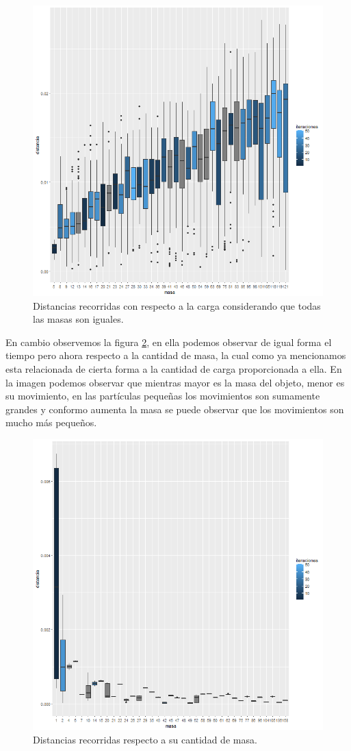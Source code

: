 \documentclass[a4paper]{article}
\begin{document}
\begin{figure}[h!]
\centering
\includegraphics[width=0.7\linewidth]{totaloriginal}
\caption{Distancias recorridas con respecto a la carga considerando que todas las masas son iguales.}
\label{fig:totaloriginal}
\end{figure}

En cambio observemos la figura \ref{fig:totalR}, en ella podemos observar de igual forma el tiempo pero ahora respecto a la cantidad de masa, la cual como ya mencionamos esta relacionada de cierta forma a la cantidad de carga proporcionada a ella. En la imagen podemos observar que mientras mayor es la masa del objeto, menor es su movimiento, en las partículas pequeñas los movimientos son sumamente grandes y conformo aumenta la masa se puede observar que los movimientos son mucho más pequeños.

\begin{figure}[h!]
\centering
\includegraphics[width=0.7\linewidth]{total}
\caption{Distancias recorridas respecto a su cantidad de masa.}
\label{fig:totalR}
\end{figure}
\end{document}
